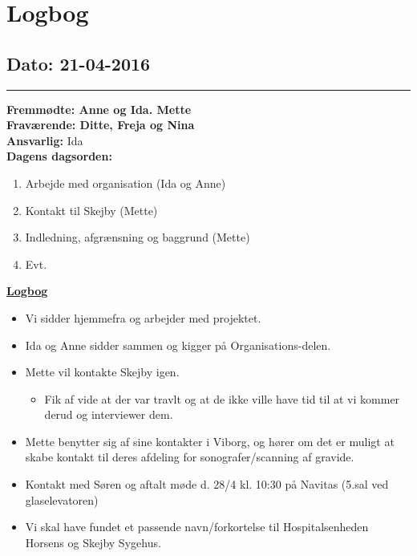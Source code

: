 \chapter{Logbog}
\section{Dato: 21-04-2016}
\hrule
\textbf{Fremmødte: Anne og Ida. Mette} \\
\textbf{Fraværende: Ditte, Freja og Nina } \\
\textbf{Ansvarlig: }Ida  \\
\textbf{Dagens dagsorden: }
\begin{enumerate}
	\item Arbejde med organisation (Ida og Anne)
	\item Kontakt til Skejby (Mette)
	\item Indledning, afgrænsning og baggrund (Mette)
	\item Evt. 
\end{enumerate}


\underline{\textbf{Logbog}}
\begin{itemize}
\item Vi sidder hjemmefra og arbejder med projektet.
\item Ida og Anne sidder sammen og kigger på Organisations-delen.
\item Mette vil kontakte Skejby igen.
\begin{itemize}
\item Fik af vide at der var travlt og at de ikke ville have tid til at vi kommer derud og interviewer dem.
\end{itemize}
\item Mette benytter sig af sine kontakter i Viborg, og hører om det er muligt at skabe kontakt til deres afdeling for sonografer/scanning af gravide.
\item Kontakt med Søren og aftalt møde d. 28/4 kl. 10:30 på Navitas (5.sal ved glaselevatoren)
\item Vi skal have fundet et passende navn/forkortelse til Hospitalsenheden Horsens og Skejby Sygehus.
\end{itemize}
